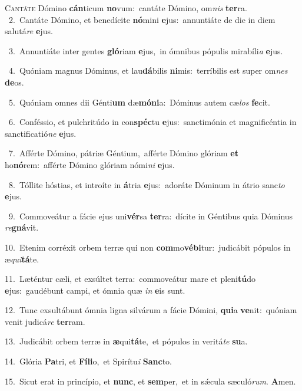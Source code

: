\lettrine{\initial\textcolor{\initialcolor}{C}}{antáte} Dómino \textbf{cán}\-ticum \textbf{no}\-vum:~\star cantáte Dómino, om\textit{nis} \textbf{ter}\-ra.\\
{\numbfont\textcolor{\numbcolor}{~2.}}~Cantáte Dómino, et benedícite \textbf{nó}\-mini \textbf{e}\-jus:~\star annuntiáte de die in diem salutá\textit{re} \textbf{e}\-jus.\par
{\numbfont\textcolor{\numbcolor}{~3.}}~Annuntiáte inter gentes \textbf{gló}\-riam \textbf{e}\-jus,~\star in ómnibus pópulis mirabíli\textit{a} \textbf{e}\-jus.\par
{\numbfont\textcolor{\numbcolor}{~4.}}~Quóniam magnus Dóminus, et lau\-\textbf{dá}\-bilis \textbf{ni}\-mis:~\star terríbilis est super om\textit{nes} \textbf{de}\-os.\par
{\numbfont\textcolor{\numbcolor}{~5.}}~Quóniam omnes dii Génti\textbf{um} dæ\-\textbf{mó}\-\textbf{ni}a:~\star Dóminus autem cæ\textit{los} \textbf{fe}\-cit.\par
{\numbfont\textcolor{\numbcolor}{~6.}}~Conféssio, et pulchritúdo in con\-\textbf{spéc}\-tu \textbf{e}\-jus:~\star sanctimónia et magnificéntia in sanctificatió\textit{ne} \textbf{e}\-jus.\par
{\numbfont\textcolor{\numbcolor}{~7.}}~Afférte Dómino, pátriæ Géntium,~\dagger afférte Dómino glóriam \textbf{et} ho\-\textbf{nó}\-rem:~\star afférte Dómino glóriam nómi\textit{ni} \textbf{e}\-jus.\par
{\numbfont\textcolor{\numbcolor}{~8.}}~Tóllite hóstias, et introíte in \textbf{á}\-tria \textbf{e}\-jus:~\star adoráte Dóminum in átrio sanc\textit{to} \textbf{e}\-jus.\par
{\numbfont\textcolor{\numbcolor}{~9.}}~Commoveátur a fácie ejus uni\-\textbf{vér}\-sa \textbf{ter}\-ra:~\star dícite in Géntibus quia Dóminus \textit{re}\-\textbf{gná}vit.\par
{\numbfont\textcolor{\numbcolor}{10.}}~Etenim corréxit orbem terræ qui non \textbf{com}\-mo\-\textbf{vé}\-\textbf{bi}tur:~\star judicábit pópulos in æ\-\textit{qui}\-\textbf{tá}te.\par
{\numbfont\textcolor{\numbcolor}{11.}}~Læténtur cæli, et exsúltet terra:~\dagger commoveátur mare et pleni\-\textbf{tú}\-do \textbf{e}\-jus:~\star gaudébunt campi, et ómnia quæ \textit{in} \textbf{e}\-is sunt.\par
{\numbfont\textcolor{\numbcolor}{12.}}~Tunc exsultábunt ómnia ligna silvárum a fácie Dómini, \textbf{qui}\-a \textbf{ve}\-nit:~\star quóniam venit judicá\textit{re} \textbf{ter}\-ram.\par
{\numbfont\textcolor{\numbcolor}{13.}}~Judicábit orbem terræ in \textbf{æ}\-qui\-\textbf{tá}\-te,~\star et pópulos in veritá\textit{te} \textbf{su}\-a.\par
{\numbfont\textcolor{\numbcolor}{14.}}~Glória \textbf{Pa}\-tri, et \textbf{Fí}\-\textbf{li}o,~\star et Spirítu\textit{i} \textbf{Sanc}\-to.\par
{\numbfont\textcolor{\numbcolor}{15.}}~Sicut erat in princípio, et \textbf{nunc}\-, et \textbf{sem}\-per,~\star et in sǽcula sæculó\-\textit{rum}\-. \textbf{A}\-men.\par
